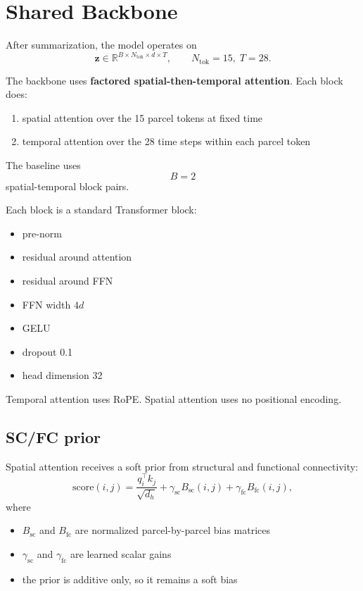 \documentclass[11pt,letterpaper]{article}
\newcommand{\R}{\mathbb{R}}
\newcommand{\bz}{\mathbf{z}}
\begin{document}
\section{Shared Backbone}

After summarization, the model operates on
\begin{equation}
\bz \in \R^{B \times N_{\text{tok}} \times d \times T},
\qquad N_{\text{tok}} = 15, \; T = 28.
\end{equation}

The backbone uses \textbf{factored spatial-then-temporal attention}. Each block does:
\begin{enumerate}[leftmargin=2em, itemsep=0.2em]
\item spatial attention over the 15 parcel tokens at fixed time
\item temporal attention over the 28 time steps within each parcel token
\end{enumerate}

The baseline uses
\begin{equation}
B = 2
\end{equation}
spatial-temporal block pairs.

Each block is a standard Transformer block:
\begin{itemize}[leftmargin=2em, itemsep=0.2em]
\item pre-norm
\item residual around attention
\item residual around FFN
\item FFN width \(4d\)
\item GELU
\item dropout 0.1
\item head dimension 32
\end{itemize}

Temporal attention uses RoPE. Spatial attention uses no positional encoding.

\subsection{SC/FC prior}

Spatial attention receives a soft prior from structural and functional connectivity:
\begin{equation}
\text{score}(i,j)
=
\frac{q_i^\top k_j}{\sqrt{d_h}}
+
\gamma_{\text{sc}} B_{\text{sc}}(i,j)
+
\gamma_{\text{fc}} B_{\text{fc}}(i,j),
\end{equation}
where
\begin{itemize}[leftmargin=2em, itemsep=0.2em]
\item $B_{\text{sc}}$ and $B_{\text{fc}}$ are normalized parcel-by-parcel bias matrices
\item $\gamma_{\text{sc}}$ and $\gamma_{\text{fc}}$ are learned scalar gains
\item the prior is additive only, so it remains a soft bias
\end{itemize}
\end{document}
